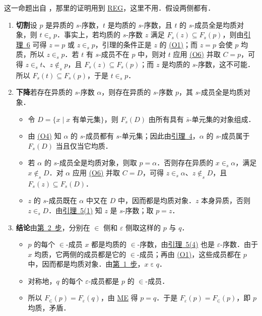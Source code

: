 \documentclass{article}
\makeatletter
\let\zhorighyperref\hyperref
\renewcommand{\hyperref}[2][]{\zhorighyperref[#1]{\mbox{#2}}}
\newlength{\ccwd}
\renewcommand{\proofname}{证明}
\renewenvironment{proof}[1][\proofname]{\par\pushQED{\qed}\normalfont\topsep6bp\@plus2bp\@minus1bp\relax
  \trivlist\item[\hskip\labelsep\hskip2\ccwd\bfseries #1\hspace{\dimexpr1em-\labelsep\relax}]\ignorespaces}{\popQED\endtrivlist\@endpefalse}
\theoremstyle{zh}
\newcommand{\eps}{\varepsilon}
\newcommand{\os}{\bar s}
\newcommand{\ME}{\textup{ME}}
\newcommand{\REG}{\textup{REG}}
\makeatother
\begin{document}
\begin{proof}
这一命题出自 \cite[定理 5.1 后]{H05}，那里的证明用到 \hyperref[ax:REG]{\REG}，这里不用．假设两侧都有．
\begin{enumerate}[label=\arabic*.]
\item\label{step:cut} \textbf{切割}\quad 设 $p$ 是异质的 $s$-序数，$t$ 是均质的 $s$-序数，且 $t$ 的 $s$-成员全是均质对象，则 $t \in_s p$．事实上，若均质的 $s$-序数 $z$ 满足 $F_s(z) \subseteq F_s(p)$，则由\hyperref[lem:6]{引理~6} 可得 $z = p$ 或 $z \in_s p$，引理的条件正是 $z$ 的 \hyperref[ord:O1]{(O1)}；而 $z = p$ 会使 $p$ 均质，所以 $z \in_s p$．若 $t$ 有 $s$-成员不在 $p$ 中，则对 $t$ 应用 \hyperref[ord:O6]{(O6)} 并取 $C = p$，可得 $z \in_s t$、$z \notin_s p$，且 $F_s(z) \subseteq F_s(p)$；而 $z$ 是均质的 $s$-序数，这不可能．所以 $F_s(t) \subseteq F_s(p)$，于是 $t \in_s p$．
\item\label{step:descent} \textbf{下降}\quad 若存在异质的 $s$-序数 $\alpha$，则存在异质的 $s$-序数 $p$，其 $s$-成员全是均质对象．
\begin{itemize}
\item 令 $D = \{x \mid x \text{ 有单元集}\}$，则 $F_s(D)$ 由所有具有 $\os$-单元集的对象组成．
\item 由 \hyperref[ord:O4]{(O4)} 知 $\alpha$ 的 $s$-成员都有 $s$-单元集；因此由\hyperref[lem:4]{引理~4}，$\alpha$ 的 $s$-成员属于 $F_s(D)$ 当且仅当它均质．
\item 若 $\alpha$ 的 $s$-成员全是均质对象，则取 $p = \alpha$．否则存在异质的 $x \in_s \alpha$，满足 $x \notin_s D$．对 $\alpha$ 应用 \hyperref[ord:O6]{(O6)} 并取 $C = D$，可得 $z \in_s \alpha$、$z \notin_s D$，且 $F_s(z) \subseteq F_s(D)$．
\item $z$ 的 $s$-成员既在 $\alpha$ 中又在 $D$ 中，因而都是均质对象．$z$ 本身异质，否则 $z \in_s D$．由\hyperref[lem:5a]{引理~5(1)} 知 $z$ 是 $s$-序数；取 $p = z$．
\end{itemize}
\item \textbf{结论}\quad 由\hyperref[step:descent]{第 2 步}，分别在 $\in$ 侧和 $\eps$ 侧取这样的 $p$ 与 $q$．
\begin{itemize}
\item $p$ 的每个 $\in$-成员 $x$ 都是均质的 $\in$-序数，由\hyperref[lem:5d]{引理~5(4)} 也是 $\eps$-序数．由于 $x$ 均质，它两侧的成员都是它的 $\in$-成员；再由 \hyperref[ord:O1]{(O1)}，这些成员都在 $p$ 中，因而都是均质对象．由\hyperref[step:cut]{第 1 步}，$x \mathrel{\eps} q$．
\item 对称地，$q$ 的每个 $\eps$-成员都是 $p$ 的 $\in$-成员．
\item 所以 $F_{\in}(p) = F_{\eps}(q)$，由 \hyperref[ax:ME]{\ME}{} 得 $p = q$．于是 $F_{\eps}(p) = F_{\in}(p)$，即 $p$ 均质，矛盾．\qedhere
\end{itemize}
\end{enumerate}
\end{proof}
\end{document}
